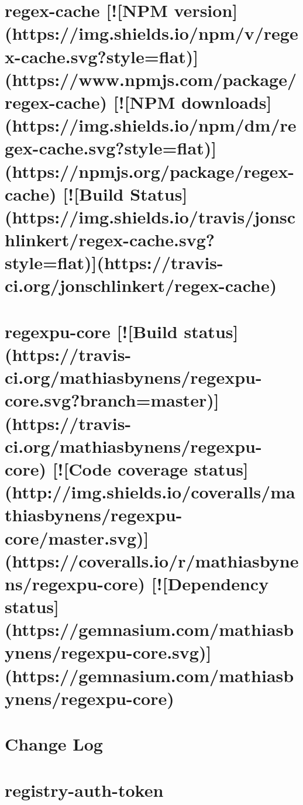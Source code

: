 \documentclass[twoside]{book}
\newcommand{\+}{\discretionary{\mbox{\scriptsize$\hookleftarrow$}}{}{}}
\begin{document}
\chapter{regex-\/cache \mbox{[}!\mbox{[}N\+PM version\mbox{]}(https\+://img.shields.\+io/npm/v/regex-\/cache.svg?style=flat)\mbox{]}(https\+://www.npmjs.\+com/package/regex-\/cache) \mbox{[}!\mbox{[}N\+PM downloads\mbox{]}(https\+://img.shields.\+io/npm/dm/regex-\/cache.svg?style=flat)\mbox{]}(https\+://npmjs.org/package/regex-\/cache) \mbox{[}!\mbox{[}Build Status\mbox{]}(https\+://img.shields.\+io/travis/jonschlinkert/regex-\/cache.svg?style=flat)\mbox{]}(https\+://travis-\/ci.org/jonschlinkert/regex-\/cache)}
\label{md__c_1_workspace_demo_src_main_script_node_modules_regex-cache__r_e_a_d_m_e}

\chapter{regexpu-\/core \mbox{[}!\mbox{[}Build status\mbox{]}(https\+://travis-\/ci.org/mathiasbynens/regexpu-\/core.svg?branch=master)\mbox{]}(https\+://travis-\/ci.org/mathiasbynens/regexpu-\/core) \mbox{[}!\mbox{[}Code coverage status\mbox{]}(http\+://img.shields.\+io/coveralls/mathiasbynens/regexpu-\/core/master.svg)\mbox{]}(https\+://coveralls.io/r/mathiasbynens/regexpu-\/core) \mbox{[}!\mbox{[}Dependency status\mbox{]}(https\+://gemnasium.com/mathiasbynens/regexpu-\/core.svg)\mbox{]}(https\+://gemnasium.com/mathiasbynens/regexpu-\/core)}
\label{md__c_1_workspace_demo_src_main_script_node_modules_regexpu-core__r_e_a_d_m_e}

\chapter{Change Log}
\label{md__c_1_workspace_demo_src_main_script_node_modules_registry-auth-token__c_h_a_n_g_e_l_o_g}

\chapter{registry-\/auth-\/token}
\label{md__c_1_workspace_demo_src_main_script_node_modules_registry-auth-token__r_e_a_d_m_e}

\end{document}
